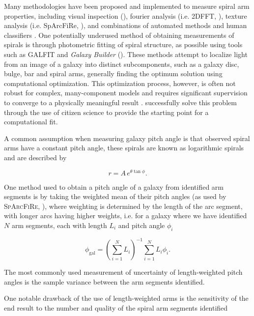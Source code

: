 Many methodologies have been proposed and implemented to measure spiral arm properties, including visual inspection (\citealt{2015A&A...582A..86H}), fourier analysis (i.e. \textsc{2DFFT}, \citealt{2012ApJS..199...33D}), texture analysis (i.e. SpArcFiRe, \citealt{2014ApJ...790...87D}), and combinations of automated methods and human classifiers \citep{2017MNRAS.472.2263H}. One potentially underused method of obtaining measurements of spirals is through photometric fitting of spiral structure, as possible using tools such as \textsc{GALFIT} \citep{2010AJ....139.2097P} and \textit{Galaxy Builder} (). These methods attempt to localize light from an image of a galaxy into distinct subcomponents, such as a galaxy disc, bulge, bar and spiral arms, generally finding the optimum solution using computational optimization. This optimization process, however, is often not robust for complex, many-component models and requires significant supervision to converge to a physically meaningful result \citep{Gao2017:1709.00746v1}.  successfully solve this problem through the use of citizen science to provide the starting point for a computational fit.

A common assumption when measuring galaxy pitch angle is that observed spiral arms have a constant pitch angle, these spirals are known as logarithmic spirals and are described by

\begin{equation}
r = A\,e^{\theta\tan\phi}.
\end{equation}

One method used to obtain a pitch angle of a galaxy from identified arm segments is by taking the weighted mean of their pitch angles (as used by \textsc{SpArcFiRe}, \citealt{2014ApJ...790...87D}), where weighting is determined by the length of the arc segment, with longer arcs having higher weights, i.e. for a galaxy where we have identified $N$ arm segments, each with length $L_i$ and pitch angle $\phi_i$

\begin{equation}
  \phi_\mathrm{gal} = \left(\sum_{i=1}^{N}L_i\right)^{-1}\sum_{i=1}^{N}L_i \phi_i.
\end{equation}

The most commonly used measurement of uncertainty of length-weighted pitch angles is the  sample variance between the arm segments identified.

One notable drawback of the use of length-weighted arms is the sensitivity of the end result to the number and quality of the spiral arm segments identified 


